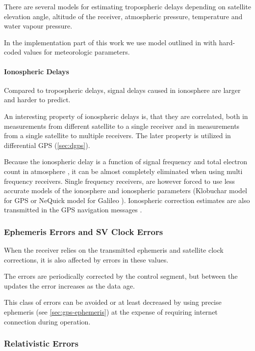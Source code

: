 There are several models for estimating tropospheric delays depending on satellite
elevation angle, altitude of the receiver, atmospheric pressure, temperature and
water vapour pressure.

In the implementation part of this work we use model outlined in \cite{navipedia-tropospheric}
with hard-coded values for meteorologic parameters.

\paragraph{Ionospheric Delays}

Compared to tropospheric delays, signal delays caused in ionosphere are larger and
harder to predict.

An interesting property of ionospheric delays is, that they are correlated,
both in measurements from different satellite to a single receiver and in measurements
from a single satellite to multiple receivers.
The later property is utilized in differential GPS (\cref{sec:dgps}).

Because the ionospheric delay is a function of signal frequency and total electron
count in atmosphere \cite{kaplan06}, it can be almost completely
eliminated when using multi frequency receivers.
Single frequency receivers, are however forced to use less accurate
models of the ionosphere and ionospheric parameters (Klobuchar model for GPS
\cite{navipedia-klobuchar} or NeQuick model for Galileo \cite{navipedia-nequick}).
Ionospheric correction estimates are also transmitted in the GPS navigation
messages \cite{fyfe92}.

\subsubsection{Ephemeris Errors and SV Clock Errors}

When the receiver relies on the transmitted ephemeris and satellite clock corrections,
it is also affected by errors in these values.

The errors are periodically corrected by the control segment, but between the updates the error
increases as the data age.

This class of errors can be avoided or at least decreased by using precise ephemeris (see \cref{sec:gps-ephemeris})
at the expense of requiring internet connection during operation.

\subsubsection{Relativistic Errors}

